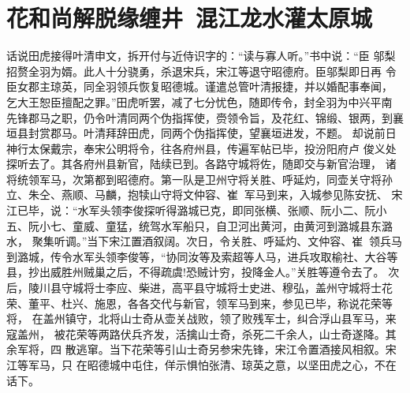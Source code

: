 \chapter{花和尚解脱缘缠井~混江龙水灌太原城}

话说田虎接得叶清申文，拆开付与近侍识字的：“读与寡人听。”书中说：“臣
邬梨招赘全羽为婿。此人十分骁勇，杀退宋兵，宋江等退守昭德府。臣邬梨即日再
令臣女郡主琼英，同全羽领兵恢复昭德城。谨遣总管叶清报捷，并以婚配事奉闻，
乞大王恕臣擅配之罪。”田虎听罢，减了七分忧色，随即传令，封全羽为中兴平南
先锋郡马之职，仍令叶清同两个伪指挥使，赍领令旨，及花红、锦缎、银两，到襄
垣县封赏郡马。叶清拜辞田虎，同两个伪指挥使，望襄垣进发，不题。
却说前日神行太保戴宗，奉宋公明将令，往各府州县，传遍军帖已毕，投汾阳府卢
俊义处探听去了。其各府州县新官，陆续已到。各路守城将佐，随即交与新官治理，
诸将统领军马，次第都到昭德府。第一队是卫州守将关胜、呼延灼，同壶关守将孙
立、朱仝、燕顺、马麟，抱犊山守将文仲容、崔，军马到来，入城参见陈安抚、
宋江已毕，说：“水军头领李俊探听得潞城已克，即同张横、张顺、阮小二、阮小
五、阮小七、童威、童猛，统驾水军船只，自卫河出黄河，由黄河到潞城县东潞水，
聚集听调。”当下宋江置酒叙阔。次日，令关胜、呼延灼、文仲容、崔，领兵马
到潞城，传令水军头领李俊等，“协同汝等及索超等人马，进兵攻取榆社、大谷等
县，抄出威胜州贼巢之后，不得疏虞!恐贼计穷，投降金人。”关胜等遵令去了。
次后，陵川县守城将士李应、柴进，高平县守城将士史进、穆弘，盖州守城将士花
荣、董平、杜兴、施恩，各各交代与新官，领军马到来，参见已毕，称说花荣等将，
在盖州镇守，北将山士奇从壶关战败，领了败残军士，纠合浮山县军马，来寇盖州，
被花荣等两路伏兵齐发，活擒山士奇，杀死二千余人，山士奇遂降。其余军将，四
散逃窜。当下花荣等引山士奇另参宋先锋，宋江令置酒接风相叙。宋江等军马，只
在昭德城中屯住，佯示惧怕张清、琼英之意，以坚田虎之心，不在话下。

